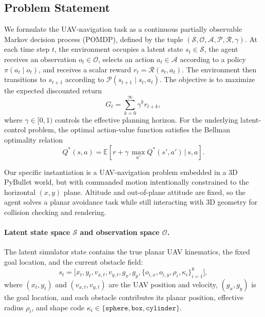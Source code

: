 \documentclass[runningheads]{llncs}
\begin{document}
\subsection{Problem Statement}
We formulate the UAV-navigation task as a continuous partially observable Markov decision process (POMDP), defined by the tuple $(\mathcal{S}, \mathcal{O}, \mathcal{A}, \mathcal{P}, \mathcal{R}, \gamma)$. At each time step $t$, the environment occupies a latent state $s_t \in \mathcal{S}$, the agent receives an observation $o_t \in \mathcal{O}$, selects an action $a_t \in \mathcal{A}$ according to a policy $\pi(a_t \mid o_t)$, and receives a scalar reward $r_t = \mathcal{R}(s_t, a_t)$. The environment then transitions to $s_{t+1}$ according to $\mathcal{P}(s_{t+1}\mid s_t, a_t)$. The objective is to maximize the expected discounted return
\begin{equation}
  G_t = \sum_{k=0}^{\infty}\gamma^k r_{t+k},
\end{equation}
where $\gamma \in [0,1)$ controls the effective planning horizon. For the underlying latent-control problem, the optimal action-value function satisfies the Bellman optimality relation
\begin{equation}
  Q^*(s,a) = \mathbb{E}\!\left[r + \gamma\,\max_{a'}Q^*(s',a') \,\Big|\, s,a\right].
\end{equation}

Our specific instantiation is a UAV-navigation problem embedded in a 3D PyBullet world, but with commanded motion intentionally constrained to the horizontal $(x,y)$ plane. Altitude and out-of-plane attitude are fixed, so the agent solves a planar avoidance task while still interacting with 3D geometry for collision checking and rendering.

\paragraph{Latent state space $\mathcal{S}$ and observation space $\mathcal{O}$.}
The latent simulator state contains the true planar UAV kinematics, the fixed goal location, and the current obstacle field:
\begin{equation}
  s_t = \bigl[x_t, y_t, v_{x,t}, v_{y,t}, g_x, g_y, \{o_{i,x}, o_{i,y}, \rho_i, \kappa_i\}_{i=1}^{8}\bigr],
\end{equation}
where $(x_t,y_t)$ and $(v_{x,t},v_{y,t})$ are the UAV position and velocity, $(g_x,g_y)$ is the goal location, and each obstacle contributes its planar position, effective radius $\rho_i$, and shape code $\kappa_i \in \{\texttt{sphere},\texttt{box},\texttt{cylinder}\}$.
\end{document}
